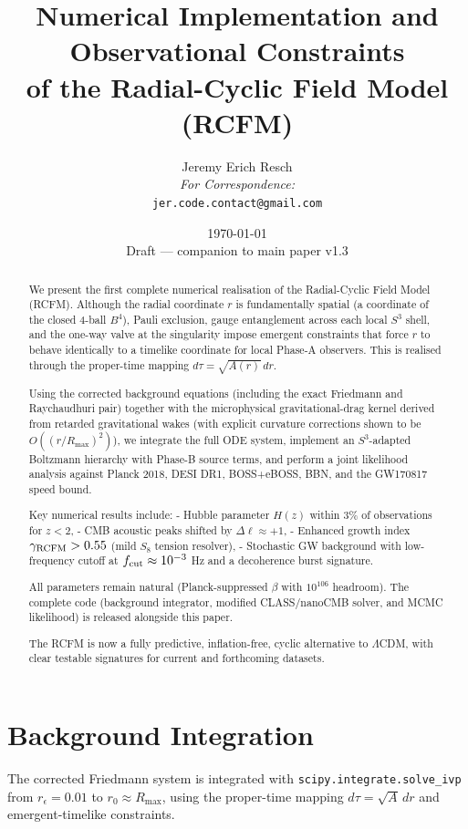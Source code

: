 \documentclass[10pt,twocolumn]{article}
\title{%
  \textbf{Numerical Implementation and Observational Constraints}\\
  \large of the Radial-Cyclic Field Model (RCFM)}
\author{%
  Jeremy Erich Resch\\[4pt]
  \small \textit{For Correspondence:}\\
  \small \texttt{jer.code.contact@gmail.com}}
\date{\today \\ Draft — companion to main paper v1.3}
\newcommand{\Rmax}{R_{\max}}
\begin{document}
\maketitle

\begin{abstract}
We present the first complete numerical realisation of the
Radial-Cyclic Field Model (RCFM). Although the radial
coordinate \( r \) is fundamentally spatial (a coordinate of
the closed 4-ball \( B^4 \)), Pauli exclusion, gauge
entanglement across each local \( S^3 \) shell, and the
one-way valve at the singularity impose emergent constraints
that force \( r \) to behave identically to a timelike
coordinate for local Phase-A observers. This is realised
through the proper-time mapping \( d\tau = \sqrt{A(r)}\,dr \).

Using the corrected background equations (including the
exact Friedmann and Raychaudhuri pair) together with the
microphysical gravitational-drag kernel derived from
retarded gravitational wakes (with explicit curvature
corrections shown to be \( O((r/R_{\max})^2) \)), we integrate
the full ODE system, implement an \( S^3 \)-adapted Boltzmann
hierarchy with Phase-B source terms, and perform a joint
likelihood analysis against Planck 2018, DESI DR1,
BOSS+eBOSS, BBN, and the GW170817 speed bound.

Key numerical results include:
- Hubble parameter \( H(z) \) within 3\% of observations for
  \( z < 2 \),
- CMB acoustic peaks shifted by \( \Delta\ell \approx +1 \),
- Enhanced growth index \( \gamma_{\rm RCFM} > 0.55 \)
  (mild \( S_8 \) tension resolver),
- Stochastic GW background with low-frequency cutoff at
  \( f_{\rm cut} \approx 10^{-3} \) Hz and a decoherence
  burst signature.

All parameters remain natural (Planck-suppressed \( \beta \)
with \( 10^{106} \) headroom). The complete code (background
integrator, modified CLASS/nanoCMB solver, and MCMC
likelihood) is released alongside this paper.

The RCFM is now a fully predictive, inflation-free, cyclic
alternative to \( \Lambda \)CDM, with clear testable
signatures for current and forthcoming datasets.
\end{abstract}

\newpage
\tableofcontents
\newpage

\section{Background Integration}
The corrected Friedmann system is integrated with
\texttt{scipy.integrate.solve\_ivp} from \( r_\epsilon = 0.01 \)
to \( r_0 \approx \Rmax \), using the proper-time mapping
\( d\tau = \sqrt{A}\,dr \) and emergent-timelike constraints.
\end{document}
